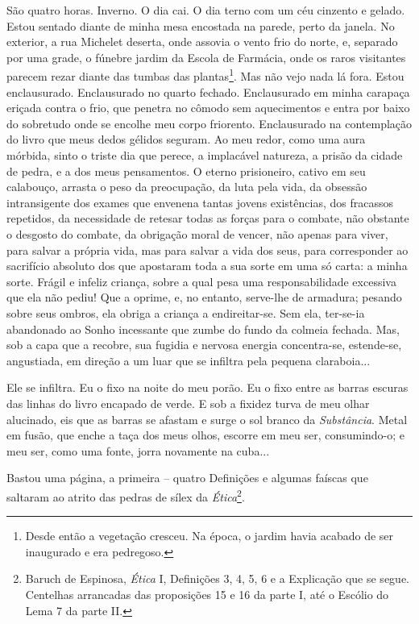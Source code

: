 São quatro horas. Inverno. O dia cai. O dia terno com um céu cinzento e
gelado. Estou sentado diante de minha mesa encostada na parede, perto da
janela. No exterior, a rua Michelet deserta, onde assovia o vento frio
do norte, e, separado por uma grade, o fúnebre jardim da Escola de
Farmácia, onde os raros visitantes parecem rezar diante das tumbas das
plantas\footnote{Desde então a vegetação cresceu. Na época, o jardim
  havia acabado de ser inaugurado e era pedregoso.}. Mas não vejo nada
lá fora. Estou enclausurado. Enclausurado no quarto fechado.
Enclausurado em minha carapaça eriçada contra o frio, que penetra no
cômodo sem aquecimentos e entra por baixo do sobretudo onde se encolhe
meu corpo friorento. Enclausurado na contemplação do livro que meus
dedos gélidos seguram. Ao meu redor, como uma aura mórbida, sinto o
triste dia que perece, a implacável natureza, a prisão da cidade de
pedra, e a dos meus pensamentos. O eterno prisioneiro, cativo em seu
calabouço, arrasta o peso da preocupação, da luta pela vida, da obsessão
intransigente dos exames que envenena tantas jovens existências, dos
fracassos repetidos, da necessidade de retesar todas as forças para o
combate, não obstante o desgosto do combate, da obrigação moral de
vencer, não apenas para viver, para salvar a própria vida, mas para
salvar a vida dos seus, para corresponder ao sacrifício absoluto dos que
apostaram toda a sua sorte em uma só carta: a minha sorte. Frágil e
infeliz criança, sobre a qual pesa uma responsabilidade excessiva que
ela não pediu! Que a oprime, e, no entanto, serve-lhe de armadura;
pesando sobre seus ombros, ela obriga a criança a endireitar-se. Sem
ela, ter-se-ia abandonado ao Sonho incessante que zumbe do fundo da
colmeia fechada. Mas, sob a capa que a recobre, sua fugidia e nervosa
energia concentra-se, estende-se, angustiada, em direção a um luar que
se infiltra pela pequena claraboia...

Ele se infiltra. Eu o fixo na noite do meu porão. Eu o fixo entre as
barras escuras das linhas do livro encapado de verde. E sob a fixidez
turva de meu olhar alucinado, eis que as barras se afastam e surge o sol
branco da \emph{Substância}. Metal em fusão, que enche a taça dos meus
olhos, escorre em meu ser, consumindo-o; e meu ser, como uma fonte,
jorra novamente na cuba...

Bastou uma página, a primeira -- quatro Definições e algumas faíscas que
saltaram ao atrito das pedras de sílex da \emph{Ética}\footnote{Baruch
  de Espinosa, \emph{Ética} I, Definições 3, 4, 5, 6 e a Explicação que
  se segue. Centelhas arrancadas das proposições 15 e 16 da parte I, até
  o Escólio do Lema 7 da parte II.}.

